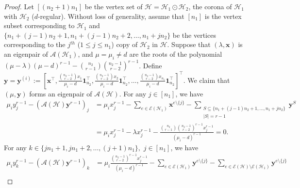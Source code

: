\documentclass[10pt,a4paper]{article}
\begin{document}
	\begin{proof}
		Let $[(n_2+1)n_1]$ be the vertex set of $\mathcal{H} = \mathcal{H}_1 \odot \mathcal{H}_2$, the corona of $\mathcal{H}_1$ with $\mathcal{H}_2$ ($d$-regular). Without loss of generality, assume that $[n_1]$ is the vertex subset corresponding to $\mathcal{H}_1$ and $\{  n_1 + (j-1)n_2+ 1, n_1 + (j-1)n_2+ 2,\ldots, n_1+jn_2\}$ be the vertices corresponding to the $j^{th}$ ($1 \leq j \leq n_1$) copy of $\mathcal{H}_2$ in $\mathcal{H}$. Suppose that $(\lambda,\mathbf{x})$ is an eigenpair of $\mathcal{A}(\mathcal{H}_1)$, and $\mu=\mu_i \neq d$ are the roots of the polynomial $(\mu-\lambda)(\mu-d)^{r-1}-\binom{n_2}{r-1}\binom{n_2-1}{r-2}^{r-1}$.
		Define $\mathbf{y}=\mathbf{y}^{(i)}:=\left[\mathbf{x}^\intercal, \frac{\binom{n_2-1}{r-2}x_1}{\mu_i-d} \mathbf{1}_{n_2}^\intercal, \frac{\binom{n_2-1}{r-2}x_2}{\mu_i-d} \mathbf{1}_{n_2}^\intercal, \ldots,  \frac{\binom{n_2-1}{r-2}x_{n_1}}{\mu_i-d} \mathbf{1}_{n_2}^\intercal \right]^{\intercal}$.
		We claim that $(\mu, \mathbf{y})$ 
		forms an eigenpair of $\mathcal{A}(\mathcal{H})$. 
		For any $j \in [n_1]$, we have 
		\begin{align*}
			\mu_i y_j^{r-1}- (\mathcal{A}(\mathcal{H})\mathbf{y}^{r-1})_j 
			&=  \mu_i x_j^{r-1}-\sum\limits_{e \in \mathcal{E}(\mathcal{H}_1)} \mathbf{x}^{e\setminus \{ j \}} - \sum\limits_{\substack{S \subseteq \{ n_1 + (j-1)n_2+ 1,\ldots, n_1+jn_2\}\\ |S|=r-1}} \mathbf{y}^{S} \\
			&=  \mu_i x_j^{r-1}-\lambda x_j^{r-1} - \frac{\binom{n_2}{r-1}\binom{n_2-1}{r-2}^{r-1} x_j^{r-1}}{(\mu_i-d)^{r-1}} =0.
		\end{align*}
		For any $k \in \{ j n_1+ 1, j n_1+2,\ldots, (j+1)n_1\},$ $j \in [n_1]$, we have 
		\begin{align*}
			\mu_i y_k^{r-1} - (\mathcal{A}(\mathcal{H})\mathbf{y}^{r-1})_k 
			&= \mu_i \frac{\binom{n_2-1}{r-2}^{r-1} x_j^{r-1}}{(\mu_i-d)^{r-1}} - \sum\limits_{e \in \mathcal{E}(\mathcal{H}_1)} \mathbf{y}^{e\setminus \{ j \}} - \sum\limits_{e \in \mathcal{E}(\mathcal{H}) \setminus \mathcal{E}(\mathcal{H}_1)} \mathbf{y}^{e\setminus \{ j \}} \\

\end{align*}
\end{proof}
\end{document}
